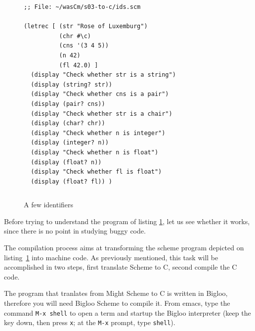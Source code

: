\documentclass[a4paper,12pt]{book}
\newenvironment{fmpage}[1]
           {\begin{lrbox}{\fmbox}\begin{minipage}{#1}}
           {\end{minipage}\end{lrbox}\fbox{\usebox{\fmbox}}}
\begin{document}
\begin{figure}[!h]
\begin{fmpage}{0.8\linewidth}
\begin{verbatim}
;; File: ~/wasCm/s03-to-c/ids.scm

(letrec [ (str "Rose of Luxemburg")
          (chr #\c)
          (cns '(3 4 5))
          (n 42)
          (fl 42.0) ]
  (display "Check whether str is a string")
  (display (string? str))
  (display "Check whether cns is a pair")
  (display (pair? cns))
  (display "Check whether str is a chair")
  (display (char? chr))
  (display "Check whether n is integer")
  (display (integer? n))
  (display "Check whether n is float")
  (display (float? n))
  (display "Check whether fl is float")
  (display (float? fl)) )
\end{verbatim}
\end{fmpage}

\begin{fmpage}{0.8\linewidth}
\begin{verbatim}

\end{verbatim}
\end{fmpage}
\caption{A few identifiers}
\label{fig:check-types}
\end{figure}

Before trying to understand the program of listing
\ref{fig:check-types}, let us see whether it works,
since there is no point in studying buggy code.

The compilation process aims at transforming the scheme
program depicted on listing~\ref{fig:check-types} into
machine code. As previously mentioned, this task will be
accomplished in two steps, first translate Scheme
to C, second compile the C code.

The program that tranlates from Might Scheme to C
is written in Bigloo, therefore you will need
Bigloo Scheme to compile it. From emacs, type the
command \verb|M-x shell| to open a term and startup
the Bigloo interpreter (keep the  key down,
then press \verb|x|; at the \verb|M-x| prompt,
type \verb|shell|).
\end{document}
